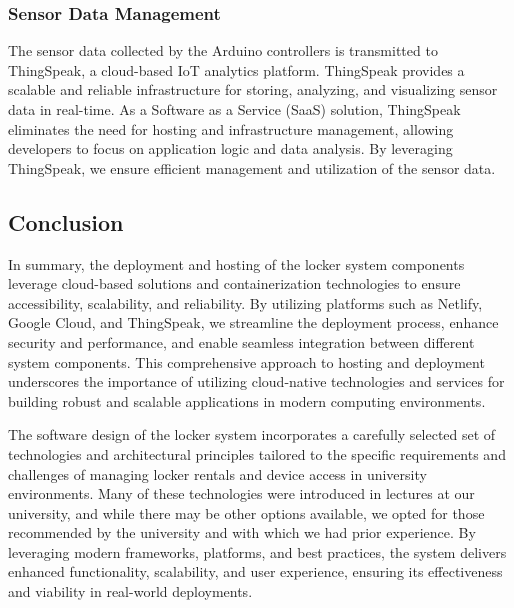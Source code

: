 \subsubsection{Sensor Data Management}

The sensor data collected by the Arduino controllers is transmitted to ThingSpeak, a cloud-based IoT analytics platform. ThingSpeak provides a scalable and reliable infrastructure for storing, analyzing, and visualizing sensor data in real-time. As a Software as a Service (SaaS) solution, ThingSpeak eliminates the need for hosting and infrastructure management, allowing developers to focus on application logic and data analysis. By leveraging ThingSpeak, we ensure efficient management and utilization of the sensor data.

\subsection{Conclusion}

In summary, the deployment and hosting of the locker system components leverage cloud-based solutions and containerization technologies to ensure accessibility, scalability, and reliability. By utilizing platforms such as Netlify, Google Cloud, and ThingSpeak, we streamline the deployment process, enhance security and performance, and enable seamless integration between different system components. This comprehensive approach to hosting and deployment underscores the importance of utilizing cloud-native technologies and services for building robust and scalable applications in modern computing environments.

The software design of the locker system incorporates a carefully selected set of technologies and architectural principles tailored to the specific requirements and challenges of managing locker rentals and device access in university environments. Many of these technologies were introduced in lectures at our university, and while there may be other options available, we opted for those recommended by the university and with which we had prior experience. By leveraging modern frameworks, platforms, and best practices, the system delivers enhanced functionality, scalability, and user experience, ensuring its effectiveness and viability in real-world deployments.

